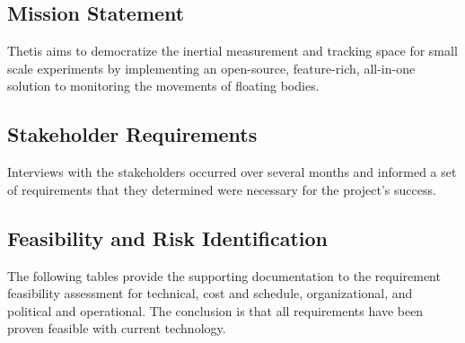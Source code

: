 \subsection{Mission Statement} \label{ssec:mission_statement}
Thetis aims to democratize the inertial measurement and tracking space for small scale experiments by implementing an open-source, feature-rich, all-in-one solution to monitoring the movements of floating bodies.

\subsection{Stakeholder Requirements} \label{ssec:stakeholder_reqs}
Interviews with the stakeholders occurred over several months and informed a set of requirements that they determined were necessary for the project's success.


\subsection{Feasibility and Risk Identification} \label{ssec:feasibility_risk}
The following tables provide the supporting documentation to the requirement feasibility assessment for technical, cost and schedule, organizational, and political and operational. The conclusion is that all requirements have been proven feasible with current technology.

